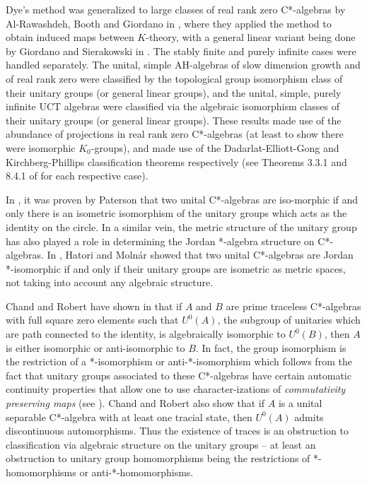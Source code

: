 \documentclass[12pt]{amsart}
\begin{document}
Dye's method was generalized to large classes of real rank zero C*-algebras by Al-Rawashdeh, Booth and Giordano in \cite{AlBoothGiordano12}, where they applied the method to obtain induced maps between $K$-theory, with a general linear variant being done by Giordano and Sierakowski in \cite{GiordanoSierakowski16}. The stably finite and purely infinite cases were handled separately. The unital, simple AH-algebras of slow dimension growth and of real rank zero were classified by the topological group isomorphism class of their unitary groups (or general linear groups), and the unital, simple, purely infinite UCT algebras were classified via the algebraic isomorphism classes of their unitary groups (or general linear groups). These results made use of the abundance of projections in real rank zero C*-algebras (at least to show there were isomorphic $K_0$-groups), and made use of the Dadarlat-Elliott-Gong \cite{Dadarlat95,Gong97} and Kirchberg-Phillips \cite{Phillips00} classification theorems respectively (see Theorems 3.3.1 and 8.4.1 of \cite{RordamBook} for each respective case).

In \cite{Paterson83}, it was proven by Paterson that two unital C*-algebras are iso\hyp{}morphic if and only there is an isometric isomorphism of the unitary groups which acts as the identity on the circle. In a similar vein, the metric structure of the unitary group has also played a role in determining the Jordan *-algebra structure on C*-algebras. In \cite{HatoriMolnar14}, Hatori and Moln{\'a}r showed that two unital C*-algebras are Jordan *-isomorphic if and only if their unitary groups are isometric as metric spaces, not taking into account any algebraic structure.

Chand and Robert have shown in \cite{ChandRobert23} that if $A$ and $B$ are prime traceless C*-algebras with full square zero elements such that $U^0(A)$, the subgroup of unitaries which are path connected to the identity, is algebraically isomorphic to $U^0(B)$, then $A$ is either isomorphic or anti-isomorphic to $B$. In fact, the group isomorphism is the restriction of a *-isomorphism or anti-*-isomorphism which follows from the fact that unitary groups associated to these C*-algebras have certain automatic continuity properties that allow one to use character\hyp{}izations of \emph{commutativity preserving maps} \cite{Bresar93} (see \cite{AraMathieubook}). Chand and Robert also show that if $A$ is a unital separable C*-algebra with at least one tracial state, then $U^0(A)$ admits discontinuous automorphisms. Thus the existence of traces is an obstruction to classification via algebraic structure on the unitary groups -- at least an obstruction to unitary group homomorphisms being the restrictions of *-homomorphisms or anti-*-homomorphisms.
\end{document}
